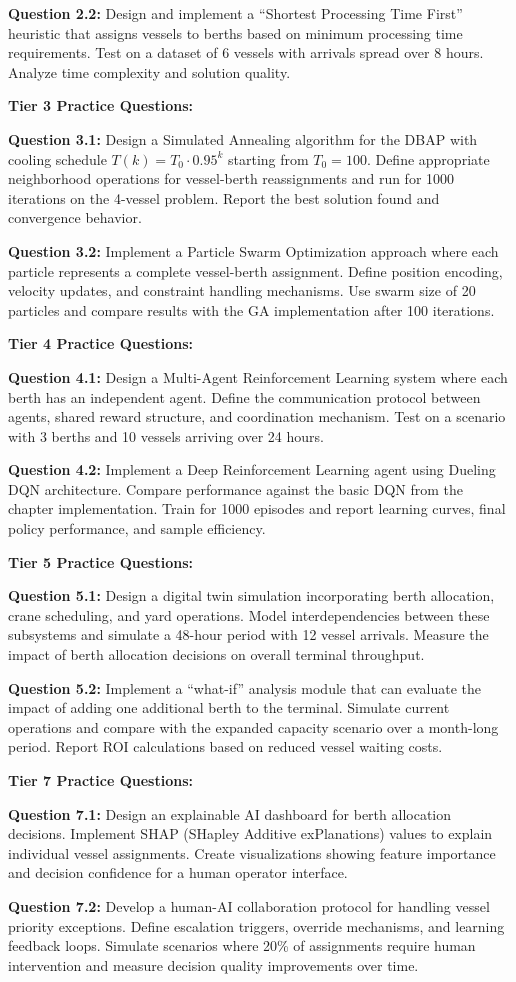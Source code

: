 \documentclass{article}
\begin{document}
\textbf{Question 2.2:} Design and implement a ``Shortest Processing Time First'' heuristic that assigns vessels to berths based on minimum processing time requirements. Test on a dataset of 6 vessels with arrivals spread over 8 hours. Analyze time complexity and solution quality.

\textbf{Tier 3 Practice Questions:}

\textbf{Question 3.1:} Design a Simulated Annealing algorithm for the DBAP with cooling schedule $T(k) = T_0 \cdot 0.95^k$ starting from $T_0 = 100$. Define appropriate neighborhood operations for vessel-berth reassignments and run for 1000 iterations on the 4-vessel problem. Report the best solution found and convergence behavior.

\textbf{Question 3.2:} Implement a Particle Swarm Optimization approach where each particle represents a complete vessel-berth assignment. Define position encoding, velocity updates, and constraint handling mechanisms. Use swarm size of 20 particles and compare results with the GA implementation after 100 iterations.

\textbf{Tier 4 Practice Questions:}

\textbf{Question 4.1:} Design a Multi-Agent Reinforcement Learning system where each berth has an independent agent. Define the communication protocol between agents, shared reward structure, and coordination mechanism. Test on a scenario with 3 berths and 10 vessels arriving over 24 hours.

\textbf{Question 4.2:} Implement a Deep Reinforcement Learning agent using Dueling DQN architecture. Compare performance against the basic DQN from the chapter implementation. Train for 1000 episodes and report learning curves, final policy performance, and sample efficiency.

\textbf{Tier 5 Practice Questions:}

\textbf{Question 5.1:} Design a digital twin simulation incorporating berth allocation, crane scheduling, and yard operations. Model interdependencies between these subsystems and simulate a 48-hour period with 12 vessel arrivals. Measure the impact of berth allocation decisions on overall terminal throughput.

\textbf{Question 5.2:} Implement a ``what-if'' analysis module that can evaluate the impact of adding one additional berth to the terminal. Simulate current operations and compare with the expanded capacity scenario over a month-long period. Report ROI calculations based on reduced vessel waiting costs.

\textbf{Tier 7 Practice Questions:}

\textbf{Question 7.1:} Design an explainable AI dashboard for berth allocation decisions. Implement SHAP (SHapley Additive exPlanations) values to explain individual vessel assignments. Create visualizations showing feature importance and decision confidence for a human operator interface.

\textbf{Question 7.2:} Develop a human-AI collaboration protocol for handling vessel priority exceptions. Define escalation triggers, override mechanisms, and learning feedback loops. Simulate scenarios where 20\% of assignments require human intervention and measure decision quality improvements over time.
\end{document}
